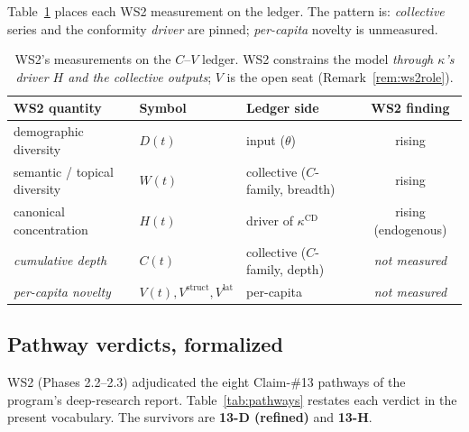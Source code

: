 \documentclass[11pt,letterpaper]{article}
\theoremstyle{definition}
\theoremstyle{plain}
\begin{document}
Table~\ref{tab:ws2fixed} places each WS2 measurement on the ledger. The pattern
is: \emph{collective} series and the conformity \emph{driver} are pinned;
\emph{per-capita} novelty is unmeasured.

\begin{table}[h]
\centering
\small
\begin{tabular}{@{}lllc@{}}
\toprule
WS2 quantity & Symbol & Ledger side & WS2 finding \\
\midrule
demographic diversity & $D(t)$ & input ($\theta$) & rising \\
semantic / topical diversity & $W(t)$ & collective ($C$-family, breadth) & rising \\
canonical concentration & $H(t)$ & driver of $\kappa^{\mathrm{CD}}$ & rising (endogenous) \\
\emph{cumulative depth} & $C(t)$ & collective ($C$-family, depth) & \emph{not measured} \\
\emph{per-capita novelty} & $V(t),V^{\mathrm{struct}},V^{\mathrm{lat}}$ & per-capita & \emph{not measured} \\
\bottomrule
\end{tabular}
\caption{WS2's measurements on the $C$--$V$ ledger. WS2 constrains the model
\emph{through $\kappa$'s driver $H$ and the collective outputs}; $V$ is the open
seat (Remark~\ref{rem:ws2role}).}
\label{tab:ws2fixed}
\end{table}

\subsection{Pathway verdicts, formalized}

WS2 (Phases 2.2--2.3) adjudicated the eight Claim-\#13 pathways of the program's
deep-research report. Table~\ref{tab:pathways} restates each verdict in the
present vocabulary. The survivors are \textbf{13-D (refined)} and \textbf{13-H}.
\end{document}
